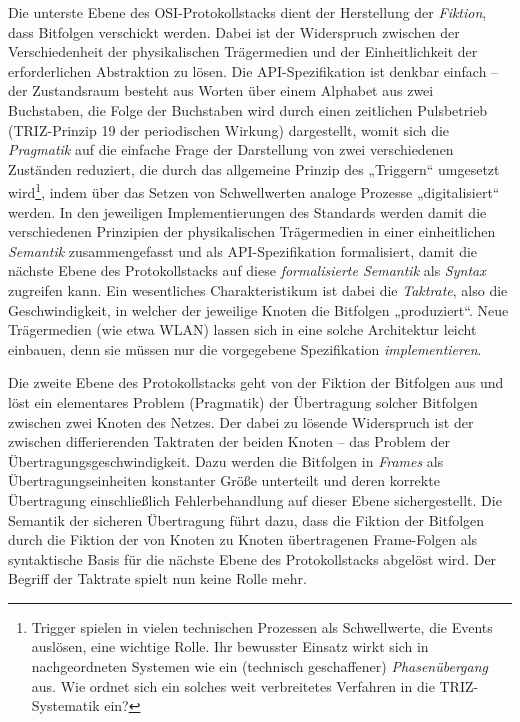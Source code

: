 \documentclass[12pt,a4paper]{article}
\begin{document}
Die unterste Ebene des OSI-Protokollstacks dient der Herstellung der
\emph{Fiktion}, dass Bitfolgen verschickt werden.  Dabei ist der Widerspruch
zwischen der Verschiedenheit der physikalischen Trägermedien und der
Einheitlichkeit der erforderlichen Abstraktion zu lösen. Die API-Spezifikation
ist denkbar einfach -- der Zustandsraum besteht aus Worten über einem Alphabet
aus zwei Buchstaben, die Folge der Buchstaben wird durch einen zeitlichen
Pulsbetrieb (TRIZ-Prinzip 19 der periodischen Wirkung) dargestellt, womit sich
die \emph{Pragmatik} auf die einfache Frage der Darstellung von zwei
verschiedenen Zuständen reduziert, die durch das allgemeine Prinzip des
„Triggern“ umgesetzt wird\footnote{Trigger spielen in vielen technischen
  Prozessen als Schwellwerte, die Events auslösen, eine wichtige Rolle. Ihr
  bewusster Einsatz wirkt sich in nachgeordneten Systemen wie ein (technisch
  geschaffener) \emph{Phasenübergang} aus.  Wie ordnet sich ein solches weit
  verbreitetes Verfahren in die TRIZ-Systematik ein?}, indem über das Setzen
von Schwellwerten analoge Prozesse „digitalisiert“ werden.  In den jeweiligen
Implementierungen des Standards werden damit die verschiedenen Prinzipien der
physikalischen Trägermedien in einer einheitlichen \emph{Semantik}
zusammengefasst und als API-Spezifikation formalisiert, damit die nächste
Ebene des Protokollstacks auf diese \emph{formalisierte Semantik} als
\emph{Syntax} zugreifen kann. Ein wesentliches Charakteristikum ist dabei die
\emph{Taktrate}, also die Geschwindigkeit, in welcher der jeweilige Knoten die
Bitfolgen „produziert“.  Neue Trägermedien (wie etwa WLAN) lassen sich in eine
solche Architektur leicht einbauen, denn sie müssen nur die vorgegebene
Spezifikation \emph{implementieren}.

Die zweite Ebene des Protokollstacks geht von der Fiktion der Bitfolgen aus
und löst ein elementares Problem (Pragmatik) der Übertragung solcher Bitfolgen
zwischen zwei Knoten des Netzes.  Der dabei zu lösende Widerspruch ist der
zwischen differierenden Taktraten der beiden Knoten -- das Problem der
Übertragungsgeschwindigkeit.  Dazu werden die Bitfolgen in \emph{Frames} als
Übertragungseinheiten konstanter Größe unterteilt und deren korrekte
Übertragung einschließlich Fehlerbehandlung auf dieser Ebene sichergestellt.
Die Semantik der sicheren Übertragung führt dazu, dass die Fiktion der
Bitfolgen durch die Fiktion der von Knoten zu Knoten übertragenen Frame-Folgen
als syntaktische Basis für die nächste Ebene des Protokollstacks abgelöst
wird.  Der Begriff der Taktrate spielt nun keine Rolle mehr. 
\end{document}
